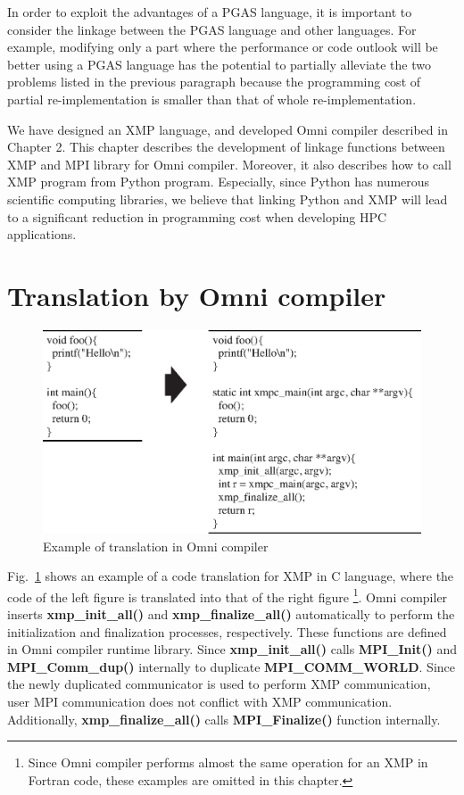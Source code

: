 \documentclass[graybox]{svmult}
\begin{document}
In order to exploit the advantages of a PGAS language,
it is important to consider the linkage between the PGAS language and other languages.
For example,
modifying only a part where the performance or code outlook will be better using a PGAS language
has the potential to partially alleviate the two problems listed in the previous paragraph because the programming cost of partial re-implementation is smaller than that of whole re-implementation.

We have designed an XMP language, and developed Omni compiler described in Chapter 2.
This chapter describes the development of linkage functions between XMP and MPI library for Omni compiler.
Moreover, it also describes how to call XMP program from Python program.
Especially,
since Python has numerous scientific computing libraries,
we believe that linking Python and XMP will lead to a significant reduction in programming cost when developing HPC applications.
\section{Translation by Omni compiler}\label{sec:translation}

\begin{figure}[h]
\sidecaption
\includegraphics[scale=.82]{img/translation.eps}
\caption{Example of translation in Omni compiler\cite{pgas-ei}} \label{fig:translation}
\end{figure}

Fig.~\ref{fig:translation} shows an example of a code translation for XMP in C language, where the code of the left figure is translated into that of the right figure
\footnote{Since Omni compiler performs almost the same operation for an XMP in Fortran code, these examples are omitted in this chapter.}.
Omni compiler inserts {\bf xmp\_init\_all()} and {\bf xmp\_finalize\_all()}  automatically  to perform the initialization and finalization processes, respectively.
These functions are defined in Omni compiler runtime library. 
Since  {\bf xmp\_init\_all()} calls  {\bf MPI\_Init()} and {\bf MPI\_Comm\_dup()} internally to duplicate {\bf MPI\_COMM\_WORLD}.
Since the newly duplicated communicator is  used to perform XMP communication,
user MPI communication does not conflict with  XMP communication.
Additionally,  {\bf xmp\_finalize\_all()}  calls  {\bf MPI\_Finalize()} function internally.
\end{document}
